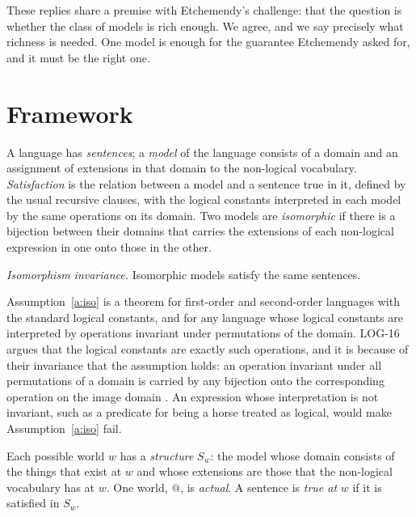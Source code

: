 \documentclass{situationist-preprint}
\begin{document}
These replies share a premise with Etchemendy's challenge: that the question is whether the class of models is rich enough. We agree, and we say precisely what richness is needed. One model is enough for the guarantee Etchemendy asked for, and it must be the right one.

\section{Framework}\label{s:frame}

\begin{definition}\label{d:models}
A language has \emph{sentences}; a \emph{model} of the language consists of a domain and an assignment of extensions in that domain to the non-logical vocabulary. \emph{Satisfaction} is the relation between a model and a sentence true in it, defined by the usual recursive clauses, with the logical constants interpreted in each model by the same operations on its domain. Two models are \emph{isomorphic} if there is a bijection between their domains that carries the extensions of each non-logical expression in one onto those in the other.
\end{definition}

\begin{assumption}\label{a:iso}
\emph{Isomorphism invariance.} Isomorphic models satisfy the same sentences.
\end{assumption}

Assumption~\ref{a:iso} is a theorem for first-order and second-order languages with the standard logical constants, and for any language whose logical constants are interpreted by operations invariant under permutations of the domain. LOG-16 argues that the logical constants are exactly such operations, and it is because of their invariance that the assumption holds: an operation invariant under all permutations of a domain is carried by any bijection onto the corresponding operation on the image domain \citep{McGee1996,Bonnay2008}. An expression whose interpretation is not invariant, such as a predicate for being a horse treated as logical, would make Assumption~\ref{a:iso} fail.

\begin{definition}\label{d:worlds}
Each possible world $w$ has a \emph{structure} $S_w$: the model whose domain consists of the things that exist at $w$ and whose extensions are those that the non-logical vocabulary has at $w$. One world, $@$, is \emph{actual}. A sentence is \emph{true at} $w$ if it is satisfied in $S_w$.
\end{definition}
\end{document}
